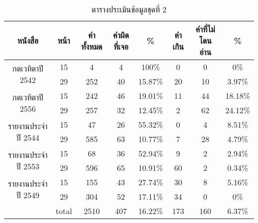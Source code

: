 \begin{table}[H]
    \caption{ตารางประเมินข้อมูลชุดที่ 2}\label{tbl:smalldata}
    \begin{tabular}{|c|c|c|c|c|c|c|c|}
        \hline
        หนังสือ                             & หน้า  & คำทั้งหมด & คำผิดที่เจอ & \%    & คำเกิน & คำที่ไม่โดนอ่าน & \%    \\ \hline
        \multirow{2}{*}{กตเวทิตาปี 2542}    & 15    & 4         & 4           & 100\%   & 0      & 0               & 0\%     \\ \cline{2-8} 
                                            & 29    & 252       & 40          & 15.87\% & 20     & 10              & 3.97\%  \\ \hline
        \multirow{2}{*}{กตเวทิตาปี 2556}    & 15    & 242       & 46          & 19.01\% & 11     & 44              & 18.18\% \\ \cline{2-8} 
                                            & 29    & 257       & 32          & 12.45\% & 2      & 62              & 24.12\% \\ \hline
        \multirow{2}{*}{รายงานประจำปี 2544} & 15    & 47        & 26          & 55.32\% & 0      & 4               & 8.51\%  \\ \cline{2-8} 
                                            & 29    & 585       & 63          & 10.77\% & 7      & 28              & 4.79\%  \\ \hline
        \multirow{2}{*}{รายงานประจำปี 2553} & 15    & 68        & 36          & 52.94\% & 9      & 2               & 2.94\%  \\ \cline{2-8} 
                                            & 29    & 596       & 65          & 10.91\% & 60     & 2               & 0.34\%  \\ \hline
        \multirow{2}{*}{รายงานประจำปี 2549} & 15    & 155       & 43          & 27.74\% & 30     & 8               & 5.16\%  \\ \cline{2-8} 
                                            & 29    & 304       & 52          & 17.11\% & 34     & 0               & 0\%     \\ \hline
                                            & total & 2510      & 407         & 16.22\% & 173    & 160             & 6.37\%  \\ \hline
        \end{tabular}
        \end{table}

